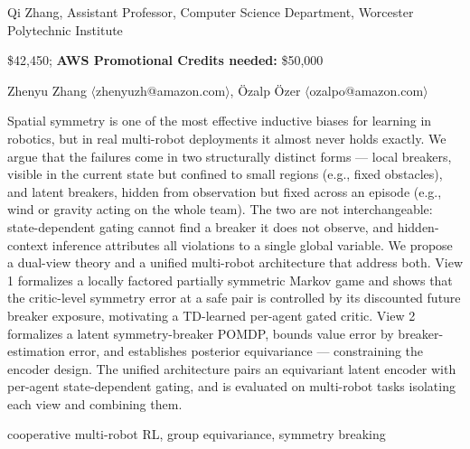 \documentclass[11pt]{article}
\begin{document}

 Qi Zhang, Assistant Professor, Computer Science Department, Worcester Polytechnic Institute

 \$42,450; \qquad
{\bf AWS Promotional Credits needed:} \$50,000

Zhenyu Zhang $\langle$zhenyuzh@amazon.com$\rangle$,
Özalp Özer $\langle$ozalpo@amazon.com$\rangle$

Spatial symmetry is one of the most effective inductive biases for learning in robotics, but in real multi-robot deployments it almost never holds exactly. We argue that the failures come in two structurally distinct forms — local breakers, visible in the current state but confined to small regions (e.g., fixed obstacles), and latent breakers, hidden from observation but fixed across an episode (e.g., wind or gravity acting on the whole team). The two are not interchangeable: state-dependent gating cannot find a breaker it does not observe, and hidden-context inference attributes all violations to a single global variable. We propose a dual-view theory and a unified multi-robot architecture that address both. View 1 formalizes a locally factored partially symmetric Markov game and shows that the critic-level symmetry error at a safe pair is controlled by its discounted future breaker exposure, motivating a TD-learned per-agent gated critic. View 2 formalizes a latent symmetry-breaker POMDP, bounds value error by breaker-estimation error, and establishes posterior equivariance — constraining the encoder design. The unified architecture pairs an equivariant latent encoder with per-agent state-dependent gating, and is evaluated on multi-robot tasks isolating each view and combining them.

cooperative multi-robot RL, group equivariance, symmetry breaking
\end{document}
